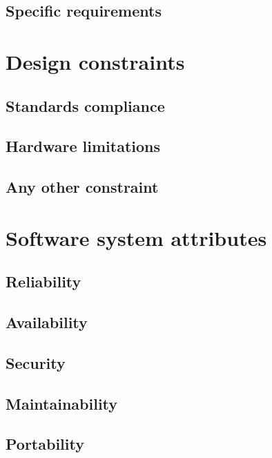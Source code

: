 \subsection{Specific requirements}

\section{Design constraints}
\subsection{Standards compliance}
\subsection{Hardware limitations}
\subsection{Any other constraint}

\section{Software system attributes}
\subsection{Reliability}
\subsection{Availability}
\subsection{Security}
\subsection{Maintainability}
\subsection{Portability}